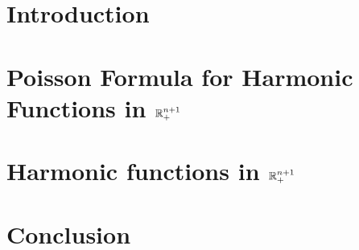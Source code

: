 \documentclass[a4paper, 11pt]{report}
\theoremstyle{plain}
\theoremstyle{definition}
\theoremstyle{remark}
\begin{document}
\chapter{Introduction}


\chapter{Poisson Formula for Harmonic Functions in $\mathbb R_+^{n+1}$}\label{ch:2}


\clearpage
\chapter{Harmonic functions in $\mathbb R_+^{n+1}$}\label{ch:3}



\clearpage
\chapter{Conclusion}



%
%
\printbibliography[heading=bibintoc]




%
%


\end{document}
